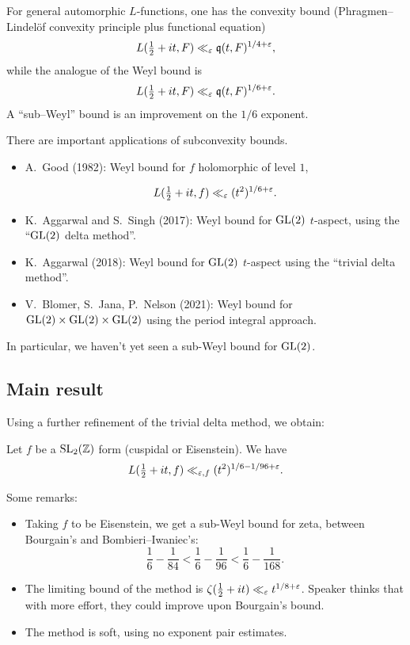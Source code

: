 \documentclass[reqno]{amsart} 
\begin{document}
For general automorphic $L$-functions, one has the convexity bound
(Phragmen--Lindel\"{o}f convexity principle plus functional equation)
\begin{equation*}
  L(\tfrac{1}{2} + i t, F) \ll_\varepsilon \mathfrak{q}(t, F)^{1/4 + \varepsilon},
\end{equation*}
while the analogue of the Weyl bound is
\begin{equation*}
  L(\tfrac{1}{2} + i t, F) \ll_\varepsilon \mathfrak{q}(t, F)^{1/6 + \varepsilon}.
\end{equation*}
A ``sub--Weyl'' bound is an improvement on the $1/6$ exponent.

There are important applications of subconvexity bounds.
\begin{itemize}
\item A.\ Good (1982): Weyl bound for $f$ holomorphic of level $1$,

  \begin{equation*}
    L(\tfrac{1}{2} + i t, f) \ll_\varepsilon(t^2)^{1/6 + \varepsilon}.
  \end{equation*}
\item K.\ Aggarwal and S.\ Singh (2017): Weyl bound for $\operatorname{GL}(2)$ $t$-aspect, using the ``$\operatorname{GL}(2)$ delta method''.
\item K.\ Aggarwal (2018): Weyl bound for $\operatorname{GL}(2)$ $t$-aspect using the ``trivial delta method''.
\item V.\ Blomer, S.\ Jana, P.\ Nelson (2021): Weyl bound for $\operatorname{GL}(2) \times \operatorname{GL}(2) \times \operatorname{GL}(2)$ using the period integral approach.
\end{itemize}
In particular, we haven't yet seen a sub-Weyl bound for $\operatorname{GL}(2)$.

\subsection{Main result}

Using a further refinement of the trivial delta method, we obtain:
\begin{theorem}
  Let $f$ be a $\operatorname{SL}_2(\mathbb{Z})$ form (cuspidal or Eisenstein).  We have
  \begin{equation*}
    L(\tfrac{1}{2} + i t, f) \ll_{\varepsilon, f}
    (t^2)^{1/6 - 1/96 + \varepsilon}.
  \end{equation*}
\end{theorem}
Some remarks:
\begin{itemize}
\item Taking $f$ to be Eisenstein, we get a sub-Weyl bound for zeta, between Bourgain's and Bombieri--Iwaniec's:
  \begin{equation*}
    \frac{1}{6} - \frac{1}{84}
    < \frac{1}{6} - \frac{1}{96}
    < \frac{1}{6} - \frac{1}{168}.
  \end{equation*}
\item The limiting bound of the method is $\zeta(\tfrac{1}{2} + i t) \ll_\varepsilon t^{1/8 + \varepsilon}$.  Speaker thinks that with more effort, they could improve upon Bourgain's bound.
\item The method is soft, using no exponent pair estimates.
\end{itemize}
\end{document}
